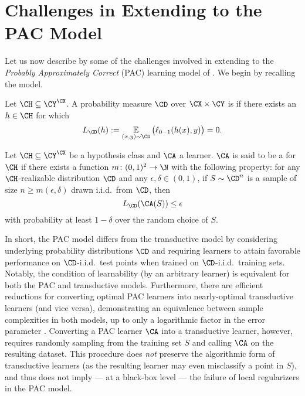 \section{Challenges in Extending to the PAC Model}\label{Section:PAC-difficulties}

Let us now describe by some of the challenges involved in extending  to the \emph{Probably Approximately Correct} (PAC) learning model of \citet{valiant1984theory}. We begin by recalling the model. 

\begin{definition}
Let $\CH \subseteq \CY^\CX$. A probability measure $\CD$ over $\CX \times \CY$ is  if there exists an $h \in \CH$ for which
\[ L_\CD(h) := \E_{(x, y) \sim \CD} \big( \ell_{0-1}(h(x), y) \big) = 0. \] 
\end{definition}

\begin{definition}
Let $\CH \subseteq \CY^\CX$ be a hypothesis class and $\CA$ a learner. $\CA$ is said to be a  for $\CH$ if there exists a function $m \colon (0, 1)^2 \to \N$ with the following property: for any $\CH$-realizable distribution $\CD$ and any $\epsilon, \delta \in (0, 1)$, if $S \sim \CD^{n}$ is a sample of size $n \geq m(\epsilon, \delta)$ drawn i.i.d.\ from $\CD$, then 
\[ L_\CD(\CA(S)) \leq \epsilon \] 
with probability at least $1 - \delta$ over the random choice of $S$. 
\end{definition}

In short, the PAC model differs from the transductive model by considering underlying probability distributions $\CD$ and requiring learners to attain favorable performance on $\CD$-i.i.d.\ test points when trained on $\CD$-i.i.d.\ training sets. Notably, the condition of learnability (by an arbitrary learner) is equivalent for both the PAC and transductive models. Furthermore, there are efficient reductions for converting optimal PAC learners into nearly-optimal transductive learners (and vice versa), demonstrating an equivalence between sample complexities in both models, up to only a logarithmic factor in the error parameter \citep{trans_equiv_pac?}. Converting a PAC learner $\CA$ into a transductive learner, however, requires randomly sampling from the training set $S$ and calling $\CA$ on the resulting dataset. This procedure does \emph{not} preserve the algorithmic form of transductive learners (as the resulting learner may even misclassify a point in $S$), and thus  does not imply --- at a black-box level --- the failure of local regularizers in the PAC model. 

